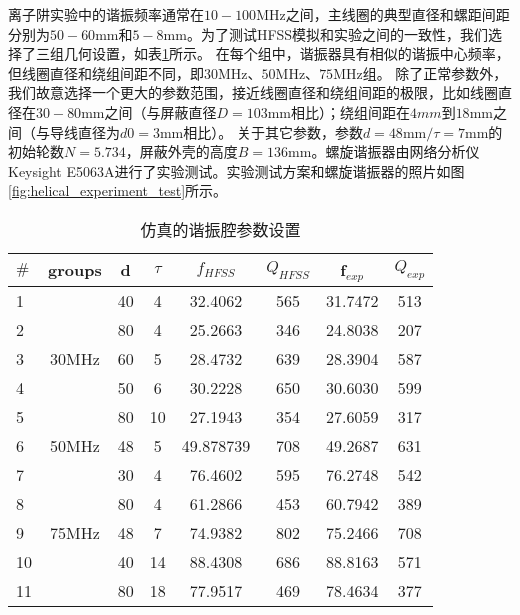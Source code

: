 离子阱实验中的谐振频率通常在$10-100$MHz之间，主线圈的典型直径和螺距间距分别为$50-60 $mm和$5-8$mm。为了测试HFSS模拟和实验之间的一致性，我们选择了三组几何设置，如表\ref{tb:helical_simulation_parameters}所示。
在每个组中，谐振器具有相似的谐振中心频率，但线圈直径和绕组间距不同，即$30$MHz、$50$MHz、$75$MHz组。
除了正常参数外，我们故意选择一个更大的参数范围，接近线圈直径和绕组间距的极限，比如线圈直径在$30-80$mm之间（与屏蔽直径$D=103$mm相比）；绕组间距在$4mm$到$ 18$mm之间（与导线直径为$d0 = 3$mm相比）。
关于其它参数，参数$d=48$mm$/\tau = 7$mm的初始轮数$N = 5.734$，屏蔽外壳的高度$ B = 136$mm。螺旋谐振器由网络分析仪Keysight E5063A进行了实验测试。实验测试方案和螺旋谐振器的照片如图\ref{fig:helical_experiment_test}所示。
\begin{table}
    \centering
    \caption[仿真的谐振腔参数设置]{仿真的谐振腔参数设置\label{tb:helical_simulation_parameters}}
    \begin{tabular}{lccccccc}
        \toprule
        $\#$ & groups & d & $\tau$ & $f_{HFSS}$ & $Q_{HFSS}$ & f$_{exp}$ & $Q_{exp}$ \\
        \midrule

        1 & \multirow{5}{*}{30MHz} 	& 40 & 4  & 32.4062 & 565 & 31.7472 & 513   \\
        2 & 						& 80 & 4  & 25.2663 & 346 & 24.8038 & 207   \\
        3 & 						& 60 & 5  & 28.4732 & 639 & 28.3904 & 587   \\
        4 & 						& 50 & 6  & 30.2228 & 650 & 30.6030 & 599   \\
        5 & 						& 80 & 10 & 27.1943 & 354 & 27.6059 & 317   \\
        \midrule
        6 & 50MHz 					& 48 & 5  & 49.878739 & 708 & 49.2687 & 631   \\
        \midrule
        7 & \multirow{5}{*}{75MHz} 	& 30 & 4  & 76.4602 & 595 & 76.2748 & 542   \\
        8 & 						& 80 & 4  & 61.2866 & 453 & 60.7942 & 389   \\
        9 & 						& 48 & 7  & 74.9382 & 802 & 75.2466 & 708   \\
        10 & 						& 40 & 14 & 88.4308 & 686 & 88.8163 & 571   \\
        11 & 						& 80 & 18 & 77.9517 & 469 & 78.4634 & 377   \\
        \bottomrule
    \end{tabular}
\end{table}


